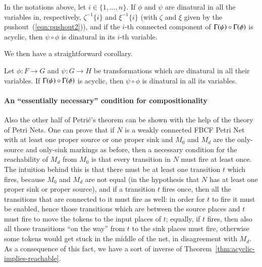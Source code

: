 \begin{theorem}\label{theorem:acyclicity implies dinaturality GENERAL}
	In the notations above, let $i\in \{1,\dots,n\}$. If $\phi$ and $\psi$ are dinatural in all the variables in, respectively, $\zeta^{-1}\{i\}$ and $\xi^{-1}\{i\}$ (with $\zeta$ and $\xi$ given by the pushout~(\ref{eqn:pushout2})), and if the $i$-th connected component of $\graph\psi \circ \graph\phi$ is acyclic, then $\psi\circ\phi$ is dinatural in its $i$-th variable.
\end{theorem}

We then have a straightforward corollary.

\begin{corollary}
	Let $\phi\colon F \to G$ and $\psi \colon G \to H$ be transformations which are dinatural in all their variables. If $\graph\psi \circ \graph\phi$ is acyclic, then $\psi\circ\phi$ is dinatural in all its variables.
\end{corollary}

%
%


\paragraph{An ``essentially necessary'' condition for compositionality} Also the other half of Petri\'c's theorem can be shown with the help of the theory of Petri Nets. One can prove that if $N$ is a weakly connected FBCF Petri Net with at least one proper source or one proper sink and $M_0$ and $M_d$ are the only-source and only-sink markings as before, then a necessary condition for the reachability of $M_d$ from $M_0$ is that every transition in $N$ must fire at least once. The intuition behind this is that there must be at least one transition $t$ which fires, because $M_0$ and $M_d$ are not equal (in the hypothesis that $N$ has at least one proper sink or proper source), and if a transition $t$ fires once, then all the transitions that are connected to it must fire as well: in order for $t$ to fire it must be enabled, hence those transitions which are between the source places and $t$ must fire to move the tokens to the input places of $t$; equally, if $t$ fires, then also all those transitions ``on the way'' from $t$ to the sink places must fire, otherwise some tokens would get stuck in the middle of the net, in disagreement with $M_d$. As a consequence of this fact, we have a sort of inverse of Theorem~\ref{thm:acyclic-implies-reachable}.

